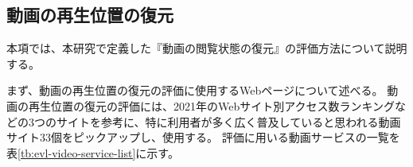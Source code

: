 \subsection{動画の再生位置の復元}
本項では、本研究で定義した『動画の閲覧状態の復元』の評価方法について説明する。

まず、動画の再生位置の復元の評価に使用するWebページについて述べる。
動画の再生位置の復元の評価には、2021年のWebサイト別アクセス数ランキング\cite{The-50-Most-Visited-Websites-in-the-World}などの3つのサイト\cite{mmd-video-research}\cite{popular-video-service}を参考に、特に利用者が多く広く普及していると思われる動画サイト33個をピックアップし、使用する。
評価に用いる動画サービスの一覧を表\ref{tb:evl-video-service-list}に示す。

